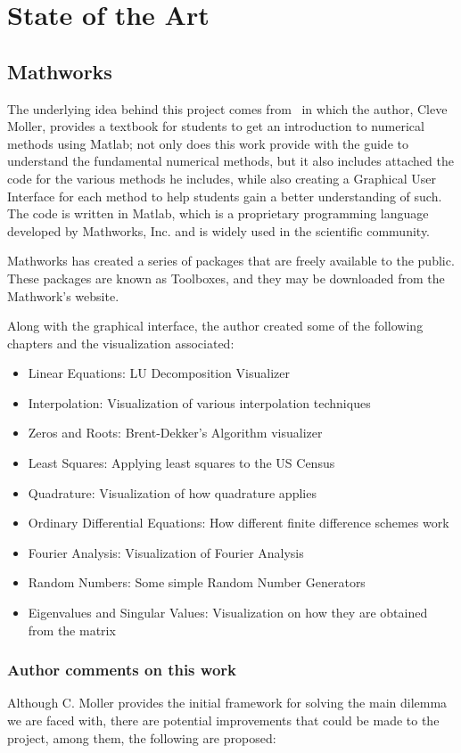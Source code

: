 \chapter{State of the Art}
\section{Mathworks}
The underlying idea behind this project comes from~\cite{doi:10.1137/1.9780898717952} in which the author, Cleve Moller, provides a textbook for students to get an introduction to numerical methods using Matlab; not only does this work provide with the guide to understand the fundamental numerical methods, but it also includes attached the code for the various methods he includes, while also creating a Graphical User Interface for each method to help students gain a better understanding of such. The code is written in Matlab, which is a proprietary programming language developed by Mathworks, Inc. and is widely used in the scientific community.

Mathworks has created a series of packages that are freely available to the public. These packages are known as Toolboxes, and they may be downloaded from the Mathwork's website. 

Along with the graphical interface, the author created some of the following chapters and the visualization associated:
\begin{itemize}
    \item Linear Equations: LU Decomposition Visualizer
    \item Interpolation: Visualization of various interpolation techniques
    \item Zeros and Roots: Brent-Dekker's Algorithm visualizer
    \item Least Squares: Applying least squares to the US Census 
    \item Quadrature: Visualization of how quadrature applies
    \item Ordinary Differential Equations: How different finite difference schemes work
    \item Fourier Analysis: Visualization of Fourier Analysis
    \item Random Numbers: Some simple Random Number Generators
    \item Eigenvalues and Singular Values: Visualization on how they are obtained from the matrix
\end{itemize}



\subsection{Author comments on this work}
Although C. Moller provides the initial framework for solving the main dilemma we are faced with, there are potential improvements that could be made to the project, among them, the following are proposed:

